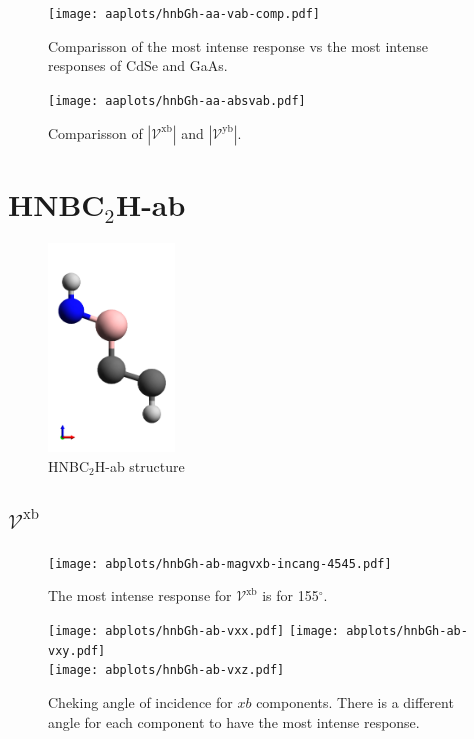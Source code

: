 \documentclass{article}
\let\Oldsection\section
\renewcommand{\section}{\FloatBarrier\Oldsection}
\let\Oldsubsection\subsection
\renewcommand{\subsection}{\FloatBarrier\Oldsubsection}
\begin{document}
\begin{figure}[ht]
    \centering
    \texttt{[image: aaplots/hnbGh-aa-vab-comp.pdf]}
    \caption{Comparisson of the most intense response vs the most intense
    responses of CdSe and GaAs.}
    \label{fig:aa-comp}
\end{figure}


\begin{figure}[h]
    \centering
    \texttt{[image: aaplots/hnbGh-aa-absvab.pdf]}
    \caption{Comparisson of $|\mathcal{V}^{\mathrm{xb}}|$ and $|\mathcal{V}^{\mathrm{yb}}|$.}    
    \label{fig:aa-xbybcomp}
\end{figure}




\section{HNBC$_{2}$H-ab} %
\label{sec:ab}

\begin{figure}[h]
    \centering
    \includegraphics[width=0.3\textwidth]{../hnbGh-ab/hnbGh-ab-figures/hnbGh-ab-2}
    \caption{HNBC$_{2}$H-ab structure}
    \label{fig:abstruc}
\end{figure}

\subsection{$\mathcal{V}^{\mathrm{xb}} $}
\begin{figure}[h!]
    \centering
    \texttt{[image: abplots/hnbGh-ab-magvxb-incang-4545.pdf]}
    \caption{The most intense response for $\mathcal{V}^{\mathrm{xb}} $ is for 
    155$^{\circ}$.}
    \label{fig:ab-magvxbincang}
\end{figure}
\begin{figure}[h!]
    \centering
    \texttt{[image: abplots/hnbGh-ab-vxx.pdf]}
    \texttt{[image: abplots/hnbGh-ab-vxy.pdf]}\\
    \texttt{[image: abplots/hnbGh-ab-vxz.pdf]}
    \caption{Cheking angle of incidence for $xb$ components. There is a
    different angle for each component to have the most intense response.}
    \label{fig:ab-xbangcomp}
\end{figure}
\end{document}
